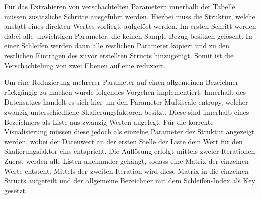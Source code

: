 \begin{minipage}{\linewidth}

\end{minipage}

Für das Extrahieren von verschachtelten Parametern innerhalb der Tabelle müssen zusätzliche Schritte ausgeführt werden. Hierbei muss die Struktur, welche anstatt eines direkten Wertes vorliegt, aufgelöst werden. Im ersten Schritt werden dabei alle unwichtigen Parameter, die keinen Sample-Bezug besitzen gelöscht. In einer Schleifen werden dann alle restlichen Parameter kopiert und zu den restlichen Einträgen des zuvor erstellten Structs hinzugefügt. Somit ist die Verschachtelung von zwei Ebenen auf eine reduziert.

\begin{minipage}{\linewidth}

\end{minipage}

Um eine Reduzierung mehrerer Parameter auf einen allgemeinen Bezeichner rückgängig zu machen wurde folgendes Vorgehen implementiert. Innerhalb des Datensatzes handelt es sich hier um den Parameter \glqq Multiscale entropy\grqq{}, welcher zwanzig unterschiedliche Skalierungsfaktoren besitzt. Diese sind innerhalb eines Bezeichners als Liste aus zwanzig Werten angelegt. Für die korrekte Visualisierung müssen diese jedoch als einzelne Parameter der Struktur angezeigt werden, wobei der Datenwert an der ersten Stelle der Liste dem Wert für den Skalierungsfaktor eins entspricht. Die Auflösung erfolgt mittels zweier Iterationen. Zuerst werden alle Listen aneinander gehängt, sodass eine Matrix der einzelnen Werte entsteht. Mittels der zweiten Iteration wird diese Matrix in die einzelnen Structs aufgeteilt und der allgemeine Bezeichner mit dem Schleifen-Index als Key gesetzt.

\begin{minipage}{\linewidth}

\end{minipage}

